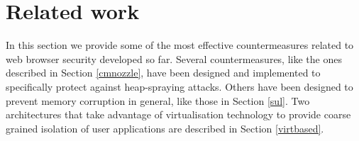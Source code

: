 %




\section{Related work}\label{bub:related}
In this section we provide some of the most effective countermeasures related to web browser security developed so far. Several countermeasures, like the ones described in Section \ref{cmnozzle}, have been designed and implemented to specifically protect against heap-spraying attacks. Others have been designed to prevent memory corruption in general, like those in Section \ref{sul}. 
Two architectures that take advantage of virtualisation technology to provide coarse grained isolation of user applications are described in Section \ref{virtbased}. 

